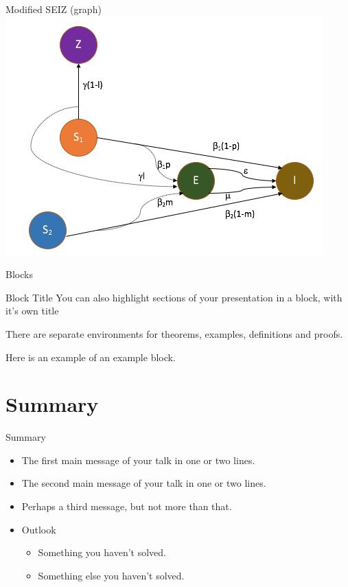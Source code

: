 \documentclass{beamer}
\begin{document}
\begin{frame}{Modified SEIZ (graph)}
\center
\includegraphics[width=.7\textwidth]{graphS1S1EIZ.png}
    
\end{frame}
\begin{frame}{Blocks}
\begin{block}{Block Title}
You can also highlight sections of your presentation in a block, with it's own title
\end{block}
\begin{theorem}
There are separate environments for theorems, examples, definitions and proofs.
\end{theorem}
\begin{example}
Here is an example of an example block.
\end{example}
\end{frame}

\section*{Summary}

\begin{frame}{Summary}
  \begin{itemize}
  \item
    The \alert{first main message} of your talk in one or two lines.
  \item
    The \alert{second main message} of your talk in one or two lines.
  \item
    Perhaps a \alert{third message}, but not more than that.
  \end{itemize}
  
  \begin{itemize}
  \item
    Outlook
    \begin{itemize}
    \item
      Something you haven't solved.
    \item
      Something else you haven't solved.
    \end{itemize}
  \end{itemize}
\end{frame}
\end{document}
